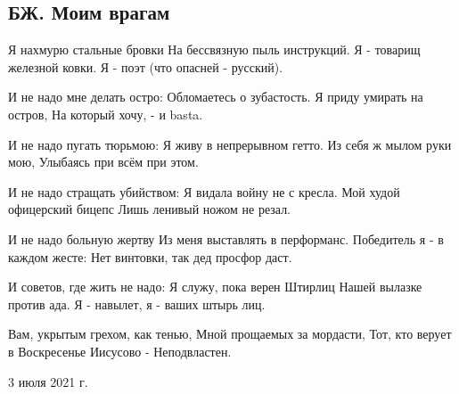  
 
 
 
 
\subsection{БЖ. Моим врагам}

Я нахмурю стальные бровки
На бессвязную пыль инструкций.
Я - товарищ железной ковки.
Я - поэт (что опасней - русский).

И не надо мне делать остро:
Обломаетесь о зубастость.
Я приду умирать на остров,
На который хочу, - и basta.

И не надо пугать тюрьмою:
Я живу в непрерывном гетто.
Из себя ж мылом руки мою,
Улыбаясь при всём при этом.

И не надо стращать убийством:
Я видала войну не с кресла.
Мой худой офицерский бицепс
Лишь ленивый ножом не резал.

И не надо больную жертву
Из меня выставлять в перформанс.
Победитель я - в каждом жесте:
Нет винтовки, так дед просфор даст.

И советов, где жить не надо:
Я служу, пока верен Штирлиц
Нашей вылазке против ада.
Я - навылет, я - ваших штырь лиц.

Вам, укрытым грехом, как тенью,
Мной прощаемых за мордасти,
Тот, кто верует в Воскресенье
Иисусово - 
Неподвластен.

3 июля 2021 г.
